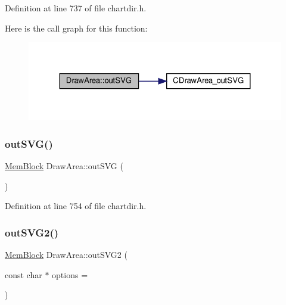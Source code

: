 Definition at line 737 of file chartdir.\+h.

Here is the call graph for this function\+:
\nopagebreak
\begin{figure}[H]
\begin{center}
\leavevmode
\includegraphics[width=324pt]{class_draw_area_a1cb1704b9105de12e527e6fdf4a27070_cgraph}
\end{center}
\end{figure}
\mbox{\label{class_draw_area_ad16b7ba25c61be695cc594ff549e2a6d}} 
\subsubsection{\texorpdfstring{out\+S\+V\+G()}{outSVG()}\hspace{0.1cm}{\footnotesize\ttfamily [2/2]}}
{\footnotesize\ttfamily \hyperlink{class_mem_block}{Mem\+Block} Draw\+Area\+::out\+S\+VG (\begin{DoxyParamCaption}{ }\end{DoxyParamCaption})\hspace{0.3cm}{\ttfamily [inline]}}



Definition at line 754 of file chartdir.\+h.

\mbox{\label{class_draw_area_a35b457e9540d7ba4fbf224b8e0d5ed73}} 
\subsubsection{\texorpdfstring{out\+S\+V\+G2()}{outSVG2()}}
{\footnotesize\ttfamily \hyperlink{class_mem_block}{Mem\+Block} Draw\+Area\+::out\+S\+V\+G2 (\begin{DoxyParamCaption}\item[{const char $\ast$}]{options = {} }\end{DoxyParamCaption})\hspace{0.3cm}{\ttfamily [inline]}}



